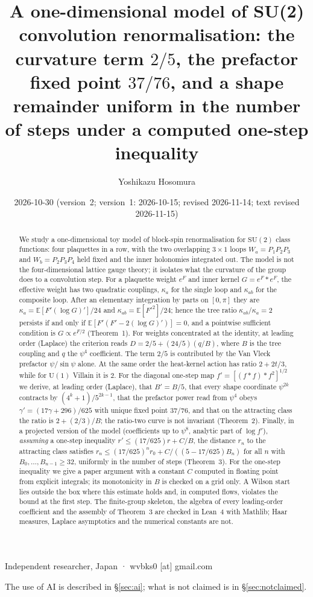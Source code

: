 \documentclass[11pt,a4paper]{article}
\title{A one-dimensional model of SU(2) convolution renormalisation: the curvature term $2/5$, the prefactor fixed point $37/76$, and a shape remainder uniform in the number of steps under a computed one-step inequality}
\author{Yoshikazu Hosomura}
\date{2026-10-30 (version~2; version~1: 2026-10-15; revised 2026-11-14; text revised 2026-11-15)}
\theoremstyle{definition}
\theoremstyle{remark}
\newcommand{\E}{\mathbb{E}}
\newcommand{\SU}{\mathrm{SU}(2)}
\begin{document}
\maketitle
\begin{center}\small Independent researcher, Japan · wvbks0 [at] gmail.com\end{center}
\begin{center}\small The use of AI is described in \S\ref{sec:ai}; what is not claimed is in \S\ref{sec:notclaimed}.\end{center}

\begin{abstract}
We study a one-dimensional toy model of block-spin renormalisation for $\SU$ class functions: four plaquettes in a row, with the two overlapping $3\times1$ loops $W_a=P_1P_2P_3$ and $W_b=P_2P_3P_4$ held fixed and the inner holonomies integrated out.
The model is not the four-dimensional lattice gauge theory; it isolates what the curvature of the group does to a convolution step.
For a plaquette weight $e^{F}$ and inner kernel $G=e^F*e^F$, the effective weight has two quadratic couplings, $\kappa_a$ for the single loop and $\kappa_{ab}$ for the composite loop.
After an elementary integration by parts on $[0,\pi]$ they are $\kappa_a=\E[F'(\log G)']/24$ and $\kappa_{ab}=\E[F'^2]/24$; hence the tree ratio $\kappa_{ab}/\kappa_a=2$ persists if and only if $\E[F'(F'-2(\log G)')]=0$, and a pointwise sufficient condition is $G\propto e^{F/2}$ (Theorem~1).
For weights concentrated at the identity, at leading order (Laplace) the criterion reads $D=2/5+(24/5)(q/B)$, where $B$ is the tree coupling and $q$ the $\psi^4$ coefficient.
The term $2/5$ is contributed by the Van Vleck prefactor $\psi/\sin\psi$ alone.
At the same order the heat-kernel action has ratio $2+2t/3$, while for $\mathrm{U}(1)$ Villain it is $2$.
For the diagonal one-step map $f'=[(f*f)*f^2]^{1/2}$ we derive, at leading order (Laplace), that $B'=B/5$, that every shape coordinate $\psi^{2k}$ contracts by $(4^k+1)/5^{2k-1}$, that the prefactor power read from $\psi^4$ obeys $\gamma'=(17\gamma+296)/625$ with unique fixed point $37/76$, and that on the attracting class the ratio is $2+(2/3)/B$; the ratio-two curve is not invariant (Theorem~2).
Finally, in a projected version of the model (coefficients up to $\psi^8$, analytic part of $\log f'$), \emph{assuming} a one-step inequality $r'\le(17/625)r+C/B$, the distance $r_n$ to the attracting class satisfies $r_n\le(17/625)^n r_0+C/((5-17/625)B_n)$ for all $n$ with $B_0,\dots,B_{n-1}\ge32$, uniformly in the number of steps (Theorem~3).
For the one-step inequality we give a paper argument with a constant $C$ computed in floating point from explicit integrals; its monotonicity in $B$ is checked on a grid only.
A Wilson start lies outside the box where this estimate holds and, in computed flows, violates the bound at the first step.
The finite-group skeleton, the algebra of every leading-order coefficient and the assembly of Theorem~3 are checked in Lean~4 with Mathlib; Haar measures, Laplace asymptotics and the numerical constants are not.
\end{abstract}
\end{document}
